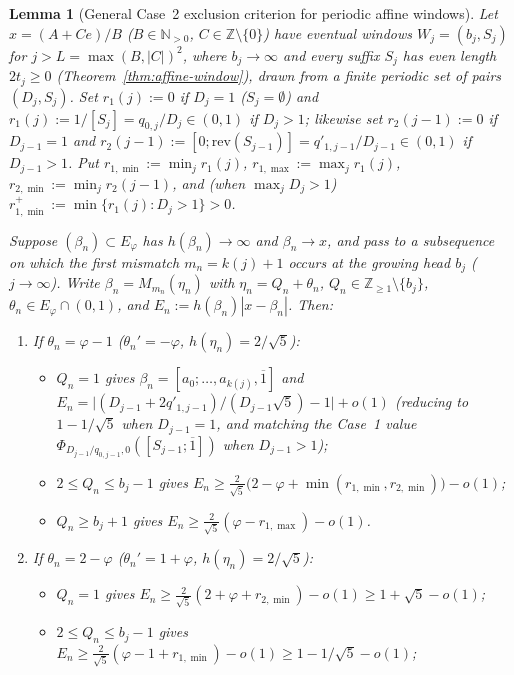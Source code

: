\documentclass[11pt]{amsart}
\newtheorem{lemma}[theorem]{Lemma}
\theoremstyle{definition}
\theoremstyle{remark}
\numberwithin{equation}{section}
\newcommand{\Z}{\mathbb{Z}}
\newcommand{\N}{\mathbb{N}}
\begin{document}
\begin{lemma}[General Case~2 exclusion criterion for periodic affine windows]\label{lem:general-case2-criterion}
Let $x=(A+Ce)/B$ ($B\in\N_{>0}$, $C\in\Z\setminus\{0\}$) have eventual
windows $W_j=(b_j,S_j)$ for $j>L=\max(B,|C|)^2$, where $b_j\to\infty$
and every suffix $S_j$ has even length $2t_j\ge0$ (Theorem~\ref{thm:affine-window}),
drawn from a finite periodic set of pairs $(D_j,S_j)$. Set
$r_1(j):=0$ if $D_j=1$ ($S_j=\emptyset$) and $r_1(j):=1/[S_j]=q_{0,j}/D_j\in(0,1)$
if $D_j>1$; likewise set $r_2(j-1):=0$ if $D_{j-1}=1$ and
$r_2(j-1):=[0;\mathrm{rev}(S_{j-1})]=q'_{1,j-1}/D_{j-1}\in(0,1)$ if $D_{j-1}>1$.
Put $r_{1,\min}:=\min_j r_1(j)$, $r_{1,\max}:=\max_j r_1(j)$,
$r_{2,\min}:=\min_j r_2(j-1)$, and (when $\max_j D_j>1$)
$r_{1,\min}^+:=\min\{r_1(j):D_j>1\}>0$.

Suppose $(\beta_n)\subset E_\varphi$ has $h(\beta_n)\to\infty$ and $\beta_n\to x$,
and pass to a subsequence on which the first mismatch $m_n=k(j)+1$ occurs
at the growing head $b_j$ ($j\to\infty$). Write $\beta_n=M_{m_n}(\eta_n)$
with $\eta_n=Q_n+\theta_n$, $Q_n\in\Z_{\ge1}\setminus\{b_j\}$,
$\theta_n\in E_\varphi\cap(0,1)$, and $E_n:=h(\beta_n)|x-\beta_n|$. Then:
\begin{enumerate}
\item[(a)] If $\theta_n=\varphi-1$ ($\theta_n'=-\varphi$, $h(\eta_n)=2/\sqrt5$):
  \begin{itemize}
  \item $Q_n=1$ gives $\beta_n=[a_0;\ldots,a_{k(j)},\overline1]$ and
        $E_n=\bigl|(D_{j-1}+2q'_{1,j-1})/(D_{j-1}\sqrt5)-1\bigr|+o(1)$
        (reducing to $1-1/\sqrt5$ when $D_{j-1}=1$, and matching the Case~1
        value $\Phi_{D_{j-1}/q_{0,j-1},0}([S_{j-1};\overline1])$ when $D_{j-1}>1$);
  \item $2\le Q_n\le b_j-1$ gives
        $E_n\ge\frac{2}{\sqrt5}\bigl(2-\varphi+\min(r_{1,\min},r_{2,\min})\bigr)-o(1)$;
  \item $Q_n\ge b_j+1$ gives
        $E_n\ge\frac{2}{\sqrt5}(\varphi-r_{1,\max})-o(1)$.
  \end{itemize}
\item[(b)] If $\theta_n=2-\varphi$ ($\theta_n'=1+\varphi$, $h(\eta_n)=2/\sqrt5$):
  \begin{itemize}
  \item $Q_n=1$ gives $E_n\ge\frac{2}{\sqrt5}(2+\varphi+r_{2,\min})-o(1)\ge 1+\sqrt5-o(1)$;
  \item $2\le Q_n\le b_j-1$ gives
        $E_n\ge\frac{2}{\sqrt5}(\varphi-1+r_{1,\min})-o(1)\ge 1-1/\sqrt5-o(1)$;

\end{itemize}
\end{enumerate}
\end{lemma}
\end{document}
